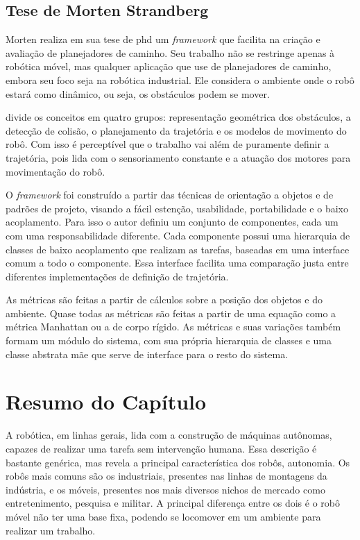 \subsection{Tese de Morten Strandberg}

Morten \cite{Strandberg2004} realiza em sua tese de phd um \textit{framework} que facilita na criação e avaliação de planejadores de caminho. Seu trabalho não se restringe apenas à robótica móvel, mas qualquer aplicação que use de planejadores de caminho, embora seu foco seja na robótica industrial. Ele considera o ambiente onde o robô estará como dinâmico, ou seja, os obstáculos podem se mover.

\cite{Strandberg2004} divide os conceitos em quatro grupos: representação geométrica dos obstáculos, a detecção de colisão, o planejamento da trajetória e os modelos de movimento do robô. Com isso é perceptível que o trabalho vai além de puramente definir a trajetória, pois lida com o sensoriamento constante e a atuação dos motores para movimentação do robô.

O \textit{framework} foi construído a partir das técnicas de orientação a objetos e de padrões de projeto, visando a fácil estenção, usabilidade, portabilidade e o baixo acoplamento. Para isso o autor definiu um conjunto de componentes, cada um com uma responsabilidade diferente. Cada componente possui uma hierarquia de classes de baixo acoplamento que realizam as tarefas, baseadas em uma interface comum a todo o componente. Essa interface facilita uma comparação justa entre diferentes implementações de definição de trajetória.

As métricas são feitas a partir de cálculos sobre a posição dos objetos e do ambiente. Quase todas as métricas são feitas a partir de uma equação como a métrica Manhattan ou a de corpo rígido. As métricas e suas variações também formam um módulo do sistema, com sua própria hierarquia de classes e uma classe abstrata mãe que serve de interface para o resto do sistema.

\section{Resumo do Capítulo}

A robótica, em linhas gerais, lida com a construção de máquinas autônomas, capazes de realizar uma tarefa sem intervenção humana. Essa descrição é bastante genérica, mas revela a principal característica dos robôs, autonomia. Os robôs mais comuns são os industriais, presentes nas linhas de montagens da indústria, e os móveis, presentes nos mais diversos nichos de mercado como entretenimento, pesquisa e militar. A principal diferença entre os dois é o robô móvel não ter uma base fixa, podendo se locomover em um ambiente para realizar um trabalho.


